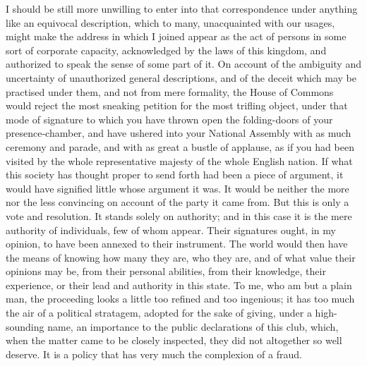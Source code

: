 I should be still more unwilling to enter into that correspondence under anything like an equivocal description, which to many, unacquainted with our usages, might make the address in which I joined appear as the act of persons in some sort of corporate capacity, acknowledged by the laws of this kingdom, and authorized to speak the sense of some part of it. On account of the ambiguity and uncertainty of unauthorized general descriptions, and of the deceit which may be practised under them, and not from mere formality, the House of Commons would reject the most sneaking petition for the most trifling object, under that mode of signature to which you have thrown open the folding-doors of your presence-chamber, and have ushered into your National Assembly with as much ceremony and parade, and with as great a bustle of applause, as if you had been visited by the whole representative majesty of the whole English nation. If what this society has thought proper to send forth had been a piece of argument, it would have signified little whose argument it was. It would be neither the more nor the less convincing on account of the party it came from. But this is only a vote and resolution. It stands solely on authority; and in this case it is the mere authority of individuals, few of whom appear. Their signatures ought, in my opinion, to have been annexed to their instrument. The world would then have the means of knowing how many they are, who they are, and of what value their opinions may be, from their personal abilities, from their knowledge, their experience, or their lead and authority in this state. To me, who am but a plain man, the proceeding looks a little too refined and too ingenious; it has too much the air of a political stratagem, adopted for the sake of giving, under a high-sounding name, an importance to the public declarations of this club, which, when the matter came to be closely inspected, they did not altogether so well deserve. It is a policy that has very much the complexion of a fraud.

